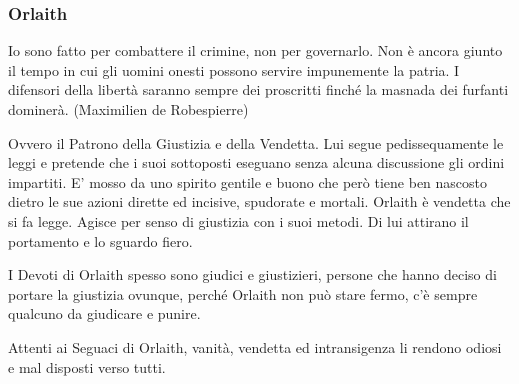 \begin{multicols}{2}
\subsubsection{Orlaith}\label{orlaith}\hypertarget{orlaith}{}

\begin{changemargin}{0.3cm}{0.3cm}\begin{enfasi}{
Io sono fatto per combattere il crimine, non per governarlo. Non è ancora giunto il tempo in cui gli uomini onesti possono servire impunemente la patria. I difensori della libertà saranno sempre dei proscritti finché la masnada dei furfanti dominerà. (Maximilien de Robespierre)
}\end{enfasi}\end{changemargin}\medskip

Ovvero il Patrono della Giustizia e della Vendetta. Lui segue pedissequamente le leggi e pretende che i suoi sottoposti eseguano senza alcuna discussione gli ordini impartiti. E' mosso da uno spirito gentile e buono che però tiene ben nascosto dietro le sue azioni dirette ed incisive, spudorate e mortali. Orlaith è vendetta che si fa legge. Agisce per senso di giustizia con i suoi metodi. Di lui attirano il portamento e lo sguardo fiero.

I Devoti di Orlaith spesso sono giudici e giustizieri, persone che hanno deciso di portare la giustizia ovunque, perché Orlaith non può stare fermo, c'è sempre qualcuno da giudicare e punire.

Attenti ai Seguaci di Orlaith, vanità, vendetta ed intransigenza li rendono odiosi e mal disposti verso tutti.


\end{multicols}
